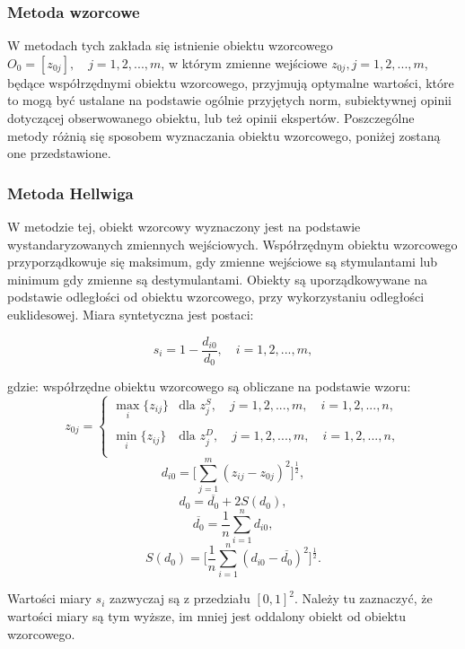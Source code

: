 \documentclass[12pt,a4paper]{report}
\begin{document}
\subsubsection{Metoda wzorcowe}
\noindent

W metodach tych zakłada się istnienie obiektu wzorcowego $O_{0}=[z_{0j}], \quad  j= 1,2,...,m$, w którym zmienne wejściowe $z_{0j},  j= 1,2,...,m$, będące współrzędnymi obiektu wzorcowego, przyjmują optymalne wartości, które to mogą być ustalane na podstawie ogólnie przyjętych norm, subiektywnej opinii dotyczącej obserwowanego obiektu, lub też opinii ekspertów. Poszczególne metody różnią się sposobem wyznaczania obiektu wzorcowego, poniżej zostaną one przedstawione.

\subsubsection{Metoda Hellwiga}
\noindent

W metodzie tej, obiekt wzorcowy wyznaczony jest na podstawie wystandaryzowanych zmiennych wejściowych. Współrzędnym obiektu wzorcowego przyporządkowuje się maksimum, gdy zmienne wejściowe są stymulantami lub minimum gdy zmienne są destymulantami. Obiekty są uporządkowywane na podstawie odległości od obiektu wzorcowego, przy wykorzystaniu odległości euklidesowej.
Miara syntetyczna jest postaci: 
\begin{center}
$$s_i=1-\frac{d_{i0}}{d_{0}},\quad i=1, 2, ..., m ,$$
\end{center}
gdzie:
\newline
współrzędne obiektu wzorcowego są obliczane na podstawie wzoru:
$$z_{0j}=\left\{ \begin{array}{ll}
\max\limits_{i} \{z_{ij}\} & \textrm{dla  } z_{j}^S,\quad j=1,2,...,m, \quad i=1,2,...,n,\\\\
\min\limits_{i} \{z_{ij}\} & \textrm{dla } z_{j}^D, \quad j=1,2,...,m, \quad i=1,2,...,n,\\
\end{array} \right. $$
$$d_{i0}=\bigg[\sum_{j=1}^{m} (z_{ij} - z_{0j})^2 \bigg]^\frac{1}{2} ,$$ 
$$d_{0}=\overline{d_{0}} + 2S(d_{0}) ,$$
$$\overline{d_{0}}=\frac{1}{n}\sum_{i=1}^{n} d_{i0} ,$$
$$S(d_{0})=\bigg[\frac{1}{n}\sum_{i=1}^{n} (d_{i0}-\overline{d_{0}})^2 \bigg]^\frac{1}{2} .$$

Wartości miary $s_{i}$ zazwyczaj są z przedziału $[0, 1]^2$. Należy tu zaznaczyć, że wartości miary są tym wyższe, im mniej jest oddalony obiekt od obiektu wzorcowego. 
\end{document}

